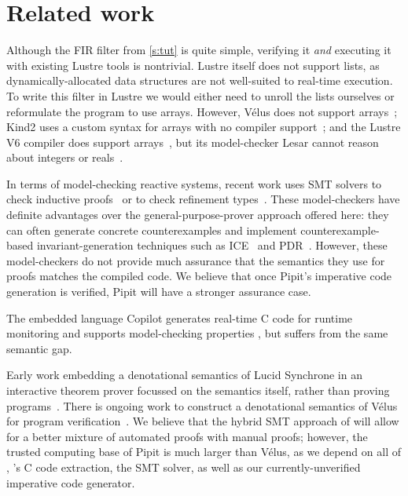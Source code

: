 
\section{Related work}
\label{s:related-work}

Although the FIR filter from \autoref{s:tut} is quite simple, verifying it \emph{and} executing it with existing Lustre tools is nontrivial.
Lustre itself does not support lists, as dynamically-allocated data structures are not well-suited to real-time execution.
To write this filter in Lustre we would either need to unroll the lists ourselves or reformulate the program to use arrays.
However, Vélus does not support arrays~\cite{bourke2017formally}; Kind2 uses a custom syntax for arrays with no compiler support~\cite{champion2016kind2}; and the Lustre V6 compiler does support arrays~\cite{jahier2016lustre}, but its model-checker Lesar cannot reason about integers or reals~\cite{raymond2008synchronous}.

In terms of model-checking reactive systems,
recent work uses SMT solvers to check inductive proofs~\cite{hagen2008scaling,champion2016kind2} or to check refinement types~\cite{chen2022synchronous}.
These model-checkers have definite advantages over the general-purpose-prover approach offered here: they can often generate concrete counterexamples and implement counterexample-based invariant-generation techniques such as ICE~\cite{garg2014ice} and PDR~\cite{bradley2011sat,een2011efficient}.
However, these model-checkers do not provide much assurance that the semantics they use for proofs matches the compiled code.
We believe that once Pipit's imperative code generation is verified, Pipit will have a stronger assurance case.

The embedded language Copilot generates real-time C code for runtime monitoring and supports model-checking properties \cite{laurent2015assuring}, but suffers from the same semantic gap.

Early work embedding a denotational semantics of Lucid Synchrone in an interactive theorem prover focussed on the semantics itself, rather than proving programs~\cite{boulme2001clocked}.
There is ongoing work to construct a denotational semantics of Vélus for program verification~\cite{bourke2022towards}.
We believe that the hybrid SMT approach of \fstar{} will allow for a better mixture of automated proofs with manual proofs;
however, the trusted computing base of Pipit is much larger than Vélus, as we depend on all of \fstar{}, \lowstar{}'s C code extraction, the SMT solver, as well as our currently-unverified imperative code generator.

